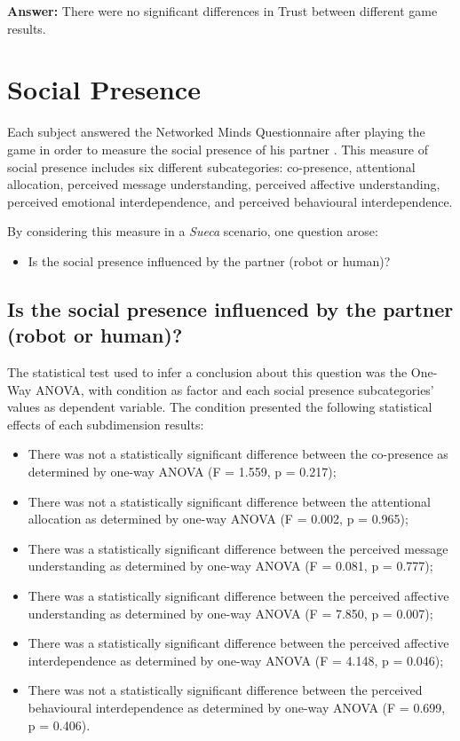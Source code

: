 \textbf{Answer:} There were no significant differences in Trust between different game results.


\section{Social Presence}
\label{sec:socialPresence}
Each subject answered the Networked Minds Questionnaire after playing the game in order to measure the social presence of his partner \cite{Harms2004}.
This measure of social presence includes six different subcategories: co-presence, attentional allocation, perceived message understanding, perceived affective understanding, perceived emotional interdependence, and perceived behavioural interdependence.

By considering this measure in a \emph{Sueca} scenario, one question arose:
\begin{itemize}
\item Is the social presence influenced by the partner (robot or human)?
\end{itemize}

\subsection*{Is the social presence influenced by the partner (robot or human)?}
The statistical test used to infer a conclusion about this question was the One-Way ANOVA, with condition as factor and each social presence subcategories' values as dependent variable.
The condition presented the following statistical effects of each subdimension results:
\begin{itemize}
\item There was not a statistically significant difference between the co-presence as determined by one-way ANOVA (F = 1.559, p = 0.217);
\item There was not a statistically significant difference between the attentional allocation as determined by one-way ANOVA (F = 0.002, p = 0.965);
\item There was a statistically significant difference between the perceived message understanding as determined by one-way ANOVA (F = 0.081, p = 0.777);
\item There was a statistically significant difference between the perceived affective understanding as determined by one-way ANOVA (F = 7.850, p = 0.007);
\item There was a statistically significant difference between the perceived affective interdependence as determined by one-way ANOVA (F = 4.148, p = 0.046);
\item There was not a statistically significant difference between the perceived behavioural interdependence as determined by one-way ANOVA (F = 0.699, p = 0.406).
\end{itemize}

